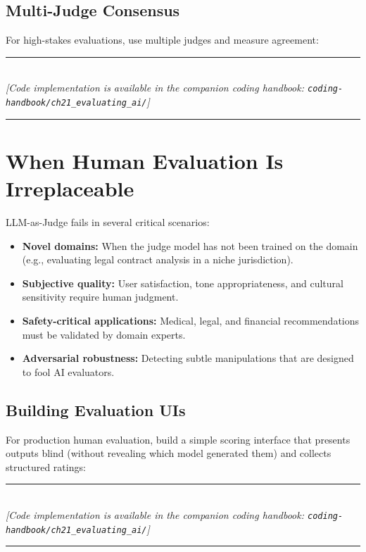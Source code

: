 \subsection{Multi-Judge Consensus}

For high-stakes evaluations, use multiple judges and measure agreement:


\begin{center}
\noindent\rule{0.6\textwidth}{0.4pt} \\
\vspace{0.3em}
\textit{[Code implementation is available in the companion coding handbook: \texttt{coding-handbook/ch21\_evaluating\_ai/}]} \\
\noindent\rule{0.6\textwidth}{0.4pt}
\end{center}


\section{When Human Evaluation Is Irreplaceable}

LLM-as-Judge fails in several critical scenarios:
\begin{itemize}
    \item \textbf{Novel domains:} When the judge model has not been trained on the domain (e.g., evaluating legal contract analysis in a niche jurisdiction).
    \item \textbf{Subjective quality:} User satisfaction, tone appropriateness, and cultural sensitivity require human judgment.
    \item \textbf{Safety-critical applications:} Medical, legal, and financial recommendations must be validated by domain experts.
    \item \textbf{Adversarial robustness:} Detecting subtle manipulations that are designed to fool AI evaluators.
\end{itemize}

\subsection{Building Evaluation UIs}
For production human evaluation, build a simple scoring interface that presents outputs blind (without revealing which model generated them) and collects structured ratings:


\begin{center}
\noindent\rule{0.6\textwidth}{0.4pt} \\
\vspace{0.3em}
\textit{[Code implementation is available in the companion coding handbook: \texttt{coding-handbook/ch21\_evaluating\_ai/}]} \\
\noindent\rule{0.6\textwidth}{0.4pt}
\end{center}


